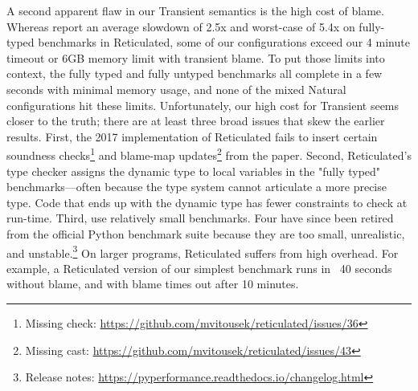 A second apparent flaw in our Transient semantics is the high cost of blame.
Whereas \citet{vss-popl-2017} report an average slowdown of 2.5x and
worst-case of 5.4x on fully-typed benchmarks in Reticulated,
some of our configurations exceed our 4 minute timeout or 6GB memory limit with transient blame.
To put those limits into context, the fully typed and fully untyped benchmarks all complete in a few seconds with minimal memory usage, and none of the mixed Natural configurations hit these limits.
Unfortunately, our high cost for Transient seems closer to the truth;
 there are at least three broad issues that skew the earlier results.
First, the 2017 implementation of Reticulated fails to insert certain
 soundness checks\footnote{Missing check: \url{https://github.com/mvitousek/reticulated/issues/36}}
 and blame-map updates\footnote{Missing cast: \url{https://github.com/mvitousek/reticulated/issues/43}}
 from the paper.
Second, Reticulated's type checker assigns the dynamic type to local
 variables in the "fully typed" benchmarks---often because the type system
 cannot articulate a more precise type.
Code that ends up with the dynamic type has fewer constraints to check at run-time.
Third, \citet{vss-popl-2017} use relatively small benchmarks.
Four have since been retired from the official Python benchmark suite
 because they are too small, unrealistic, and unstable.\footnote{Release notes: \url{https://pyperformance.readthedocs.io/changelog.html}}
On larger programs, Reticulated suffers from high overhead.
For example, a Reticulated version of our simplest benchmark runs in
 ~40 seconds without blame, and with blame times out after 10 minutes.




